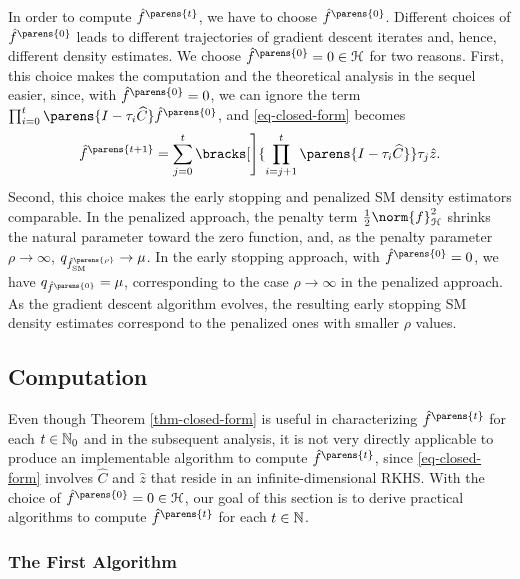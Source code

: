 In order to compute $\hat{f}^{\parens{t}}$, we have to choose $\hat{f}^{\parens{0}}$. Different choices of $\hat{f}^{\parens{0}}$ leads to different trajectories of gradient descent iterates and, hence, different density estimates. We choose $\hat{f}^{\parens{0}} = 0 \in \calH$ for two reasons. First, this choice makes the computation and the theoretical analysis in the sequel easier, since, with $\hat{f}^{\parens{0}} = 0$, we can ignore the term $\prod_{i=0}^{t} \parens{I - \tau_i \widehat{C}} \hat{f}^{\parens{0}}$, and \eqref{eq-closed-form} becomes 
\begin{align*}
	\hat{f}^{\parens{t+1}} = \sum_{j=0}^t \bracks[\Bigg]{\prod_{i=j+1}^t \parens{I - \tau_i \widehat{C}}} \tau_j \hat{z}. 
\end{align*}
Second, this choice makes the early stopping and penalized SM density estimators comparable. In the penalized approach, the penalty term $\frac{1}{2} \norm{f}_{\calH}^2$ shrinks the natural parameter toward the zero function, and, as the penalty parameter $\rho \to \infty$, $q_{\hat{f}_{\SM}^{\parens{\rho}}} \to \mu$. In the early stopping approach, with $\hat{f}^{\parens{0}} = 0$, we have $q_{\hat{f}^{\parens{0}}} = \mu$, corresponding to the case $\rho \to \infty$ in the penalized approach. As the gradient descent algorithm evolves, the resulting early stopping SM density estimates correspond to the penalized ones with smaller $\rho$ values. %

\subsection{Computation}

Even though Theorem \ref{thm-closed-form} is useful in characterizing $\hat{f}^{\parens{t}}$ for each $t \in \mathbb{N}_0$ and in the subsequent analysis, it is not very directly applicable to produce an implementable algorithm to compute $\hat{f}^{\parens{t}}$, since \eqref{eq-closed-form} involves $\widehat{C}$ and $\hat{z}$ that reside in an infinite-dimensional RKHS. With the choice of $\hat{f}^{\parens{0}} = 0 \in \calH$, our goal of this section is to derive practical algorithms to compute $\hat{f}^{\parens{t}}$ for each $t \in \mathbb{N}$. 

\subsubsection{The First Algorithm}\label{subsection-first-algorithm}

